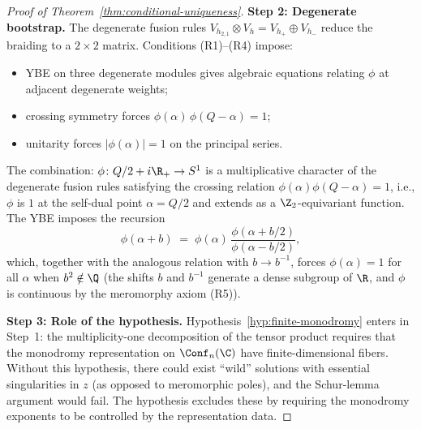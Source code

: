 \begin{proof}[Proof of Theorem~\textup{\ref{thm:conditional-uniqueness}}]
\medskip
\noindent\textbf{Step 2: Degenerate bootstrap.}
The degenerate fusion rules $V_{h_{2,1}} \otimes V_h =
V_{h_+} \oplus V_{h_-}$ reduce the braiding to a
$2 \times 2$ matrix. Conditions (R1)--(R4) impose:
\begin{itemize}
\item YBE on three degenerate modules gives algebraic equations
 relating $\phi$ at adjacent degenerate weights;
\item crossing symmetry forces
 $\phi(\alpha)\,\phi(Q - \alpha) = 1$;
\item unitarity forces $|\phi(\alpha)| = 1$ on the principal
 series.
\end{itemize}
The combination: $\phi \colon Q/2 + i\R_+ \to S^1$ is a
multiplicative character of the degenerate fusion rules satisfying
the crossing relation $\phi(\alpha)\phi(Q - \alpha) = 1$, i.e.,
$\phi$ is $1$ at the self-dual point $\alpha = Q/2$ and extends
as a $\Z_2$-equivariant function. The YBE imposes the recursion
\[
\phi(\alpha + b) \;=\; \phi(\alpha)\,
\frac{\phi(\alpha + b/2)}{\phi(\alpha - b/2)},
\]
which, together with the analogous relation with $b \to b^{-1}$,
forces $\phi(\alpha) = 1$ for all $\alpha$ when $b^2 \notin \Q$
(the shifts $b$ and $b^{-1}$ generate a dense subgroup of $\R$,
and $\phi$ is continuous by the meromorphy axiom (R5)).

\medskip
\noindent\textbf{Step 3: Role of the hypothesis.}
Hypothesis~\ref{hyp:finite-monodromy} enters in Step~1: the
multiplicity-one decomposition of the tensor product requires
that the monodromy representation on $\Conf_n(\C)$ have
finite-dimensional fibers. Without this hypothesis, there could
exist ``wild'' solutions with essential singularities in $z$
(as opposed to meromorphic poles), and the Schur-lemma argument
would fail. The hypothesis excludes these by requiring the
monodromy exponents to be controlled by the representation data.
\end{proof}

